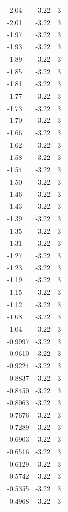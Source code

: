 \begin{longtable}{lrr}
  -2.04 & -3.22 & 3 \\
  -2.01 & -3.22 & 3 \\
  -1.97 & -3.22 & 3 \\
  -1.93 & -3.22 & 3 \\
  -1.89 & -3.22 & 3 \\
  -1.85 & -3.22 & 3 \\
  -1.81 & -3.22 & 3 \\
  -1.77 & -3.22 & 3 \\
  -1.73 & -3.22 & 3 \\
  -1.70 & -3.22 & 3 \\
  -1.66 & -3.22 & 3 \\
  -1.62 & -3.22 & 3 \\
  -1.58 & -3.22 & 3 \\
  -1.54 & -3.22 & 3 \\
  -1.50 & -3.22 & 3 \\
  -1.46 & -3.22 & 3 \\
  -1.43 & -3.22 & 3 \\
  -1.39 & -3.22 & 3 \\
  -1.35 & -3.22 & 3 \\
  -1.31 & -3.22 & 3 \\
  -1.27 & -3.22 & 3 \\
  -1.23 & -3.22 & 3 \\
  -1.19 & -3.22 & 3 \\
  -1.15 & -3.22 & 3 \\
  -1.12 & -3.22 & 3 \\
  -1.08 & -3.22 & 3 \\
  -1.04 & -3.22 & 3 \\
  -0.9997 & -3.22 & 3 \\
  -0.9610 & -3.22 & 3 \\
  -0.9224 & -3.22 & 3 \\
  -0.8837 & -3.22 & 3 \\
  -0.8450 & -3.22 & 3 \\
  -0.8063 & -3.22 & 3 \\
  -0.7676 & -3.22 & 3 \\
  -0.7289 & -3.22 & 3 \\
  -0.6903 & -3.22 & 3 \\
  -0.6516 & -3.22 & 3 \\
  -0.6129 & -3.22 & 3 \\
  -0.5742 & -3.22 & 3 \\
  -0.5355 & -3.22 & 3 \\
  -0.4968 & -3.22 & 3 \\

\end{longtable}
